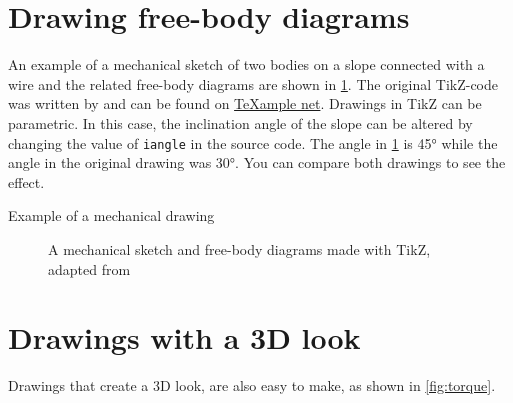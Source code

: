 \section{Drawing free-body diagrams}
An example of a mechanical sketch of two bodies on a slope connected with a wire and the related free-body diagrams are shown in \cref{fig:freebody}. The original TikZ-code was written by \cite{freebody} and can be found on \href{http://www.texample.net/tikz/examples/free-body-diagrams}{TeXample net}. Drawings in TikZ can be parametric. In this case, the inclination angle of the slope can be altered by changing the value of \verb|iangle| in the source code. The angle in \cref{fig:freebody} is \ang{45} while the angle in the original drawing was \ang{30}. You can compare both drawings to see the effect.

\begin{frame}{Example of a mechanical drawing}
    \begin{figure}[ht]\centering
        \caption{A mechanical sketch and free-body diagrams made with TikZ, adapted from \cite{freebody}}\label{fig:freebody}
    \end{figure}
\end{frame}

\section{Drawings with a 3D look}
Drawings that create a 3D look, are also easy to make, as shown in \cref{fig:torque}.

